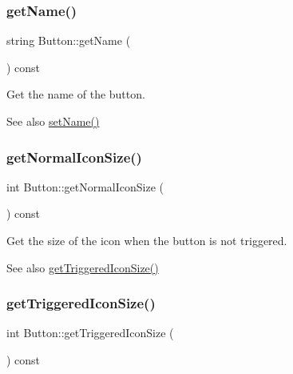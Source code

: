 \subsubsection{\texorpdfstring{get\+Name()}{getName()}}
{\footnotesize\ttfamily string Button\+::get\+Name (\begin{DoxyParamCaption}{ }\end{DoxyParamCaption}) const\hspace{0.3cm}{\ttfamily [inline]}}



Get the name of the button. 

\begin{DoxySeeAlso}{See also}
\mbox{\hyperlink{class_button_ae9ffe01e228623458eedef88ccb42dc6}{set\+Name()}} 
\end{DoxySeeAlso}
\mbox{\label{class_button_a8524ec4a0e9de07413fe445104654a90}} 
\subsubsection{\texorpdfstring{get\+Normal\+Icon\+Size()}{getNormalIconSize()}}
{\footnotesize\ttfamily int Button\+::get\+Normal\+Icon\+Size (\begin{DoxyParamCaption}{ }\end{DoxyParamCaption}) const\hspace{0.3cm}{\ttfamily [inline]}}



Get the size of the icon when the button is not triggered. 

\begin{DoxySeeAlso}{See also}
\mbox{\hyperlink{class_button_a317bc7f7c5d871d60515aa91a434f645}{get\+Triggered\+Icon\+Size()}} 
\end{DoxySeeAlso}
\mbox{\label{class_button_a317bc7f7c5d871d60515aa91a434f645}} 
\subsubsection{\texorpdfstring{get\+Triggered\+Icon\+Size()}{getTriggeredIconSize()}}
{\footnotesize\ttfamily int Button\+::get\+Triggered\+Icon\+Size (\begin{DoxyParamCaption}{ }\end{DoxyParamCaption}) const\hspace{0.3cm}{\ttfamily [inline]}}



